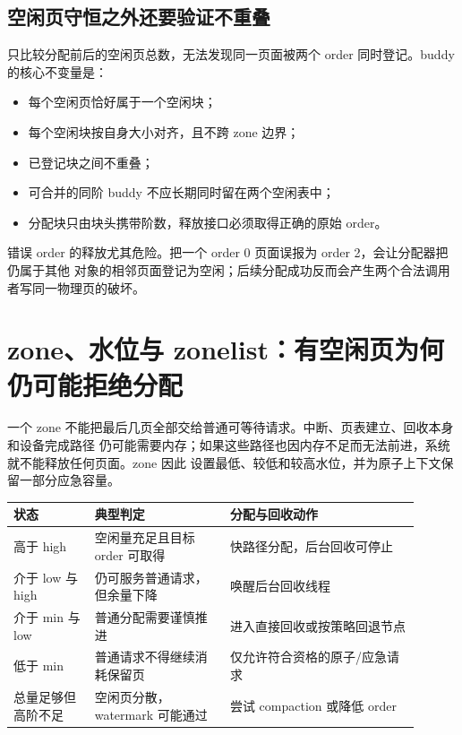 \subsection{空闲页守恒之外还要验证不重叠}

只比较分配前后的空闲页总数，无法发现同一页面被两个 order 同时登记。buddy 的核心不变量是：

\begin{itemize}
\tightlist
\item 每个空闲页恰好属于一个空闲块；
\item 每个空闲块按自身大小对齐，且不跨 zone 边界；
\item 已登记块之间不重叠；
\item 可合并的同阶 buddy 不应长期同时留在两个空闲表中；
\item 分配块只由块头携带阶数，释放接口必须取得正确的原始 order。
\end{itemize}

错误 order 的释放尤其危险。把一个 order 0 页面误报为 order 2，会让分配器把仍属于其他
对象的相邻页面登记为空闲；后续分配成功反而会产生两个合法调用者写同一物理页的破坏。

\section{zone、水位与 zonelist：有空闲页为何仍可能拒绝分配}

一个 zone 不能把最后几页全部交给普通可等待请求。中断、页表建立、回收本身和设备完成路径
仍可能需要内存；如果这些路径也因内存不足而无法前进，系统就不能释放任何页面。zone 因此
设置最低、较低和较高水位，并为原子上下文保留一部分应急容量。

\begin{longtable}{|L{0.18\linewidth}|L{0.3\linewidth}|L{0.42\linewidth}|}
\hline
状态 & 典型判定 & 分配与回收动作 \\ \hline
高于 high & 空闲量充足且目标 order 可取得 & 快路径分配，后台回收可停止 \\\tablerowrule
介于 low 与 high & 仍可服务普通请求，但余量下降 & 唤醒后台回收线程 \\\tablerowrule
介于 min 与 low & 普通分配需要谨慎推进 & 进入直接回收或按策略回退节点 \\\tablerowrule
低于 min & 普通请求不得继续消耗保留页 & 仅允许符合资格的原子/应急请求 \\\tablerowrule
总量足够但高阶不足 & 空闲页分散，watermark 可能通过 & 尝试 compaction 或降低 order \\
\hline
\end{longtable}

